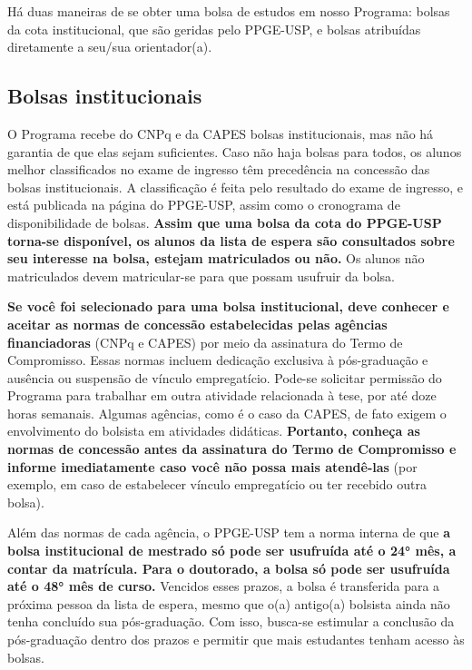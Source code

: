 Há duas maneiras de se obter uma bolsa de estudos em nosso Programa:
bolsas da cota institucional, que são geridas pelo PPGE-USP, e bolsas
atribuídas diretamente a seu/sua orientador(a).

\subsection{Bolsas institucionais}

O Programa recebe do CNPq e da CAPES bolsas institucionais, mas não há
garantia de que elas sejam suficientes.
Caso não haja bolsas para todos, os alunos melhor classificados no
exame de ingresso têm precedência na concessão das bolsas
institucionais. A classificação é feita pelo resultado do exame de
ingresso, e está publicada na página do PPGE-USP, assim como o
cronograma de disponibilidade de bolsas. \textbf{Assim que uma bolsa
  da cota do PPGE-USP torna-se disponível, os alunos da lista de
  espera são consultados sobre seu interesse na bolsa, estejam
  matriculados ou não.}  Os alunos não matriculados devem
matricular-se para que possam usufruir da bolsa.

\textbf{Se você foi selecionado para uma bolsa institucional, deve
  conhecer e aceitar as normas de concessão estabelecidas pelas
  agências financiadoras} (CNPq e CAPES) por meio da assinatura do
Termo de Compromisso. Essas normas incluem dedicação exclusiva à
pós-graduação e ausência ou suspensão de vínculo empregatício. Pode-se
solicitar permissão do Programa para trabalhar em outra atividade
relacionada à tese, por até doze horas semanais. Algumas agências,
como é o caso da CAPES, de fato exigem o envolvimento do bolsista em
atividades didáticas. \textbf{Portanto, conheça as normas de concessão
  antes da assinatura do Termo de Compromisso e informe imediatamente
  caso você não possa mais atendê-las} (por exemplo, em caso de
estabelecer vínculo empregatício ou ter recebido outra bolsa).

Além das normas de cada agência, o PPGE-USP tem a norma interna de que
\textbf{a bolsa institucional de mestrado só pode ser usufruída até o
  24° mês, a contar da matrícula. Para o doutorado, a bolsa só pode
  ser usufruída até o 48° mês de curso.} Vencidos esses prazos, a
bolsa é transferida para a próxima pessoa da lista de espera, mesmo
que o(a) antigo(a) bolsista ainda não tenha concluído sua
pós-graduação. Com isso, busca-se estimular a conclusão da
pós-graduação dentro dos prazos e permitir que mais estudantes tenham
acesso às bolsas.

